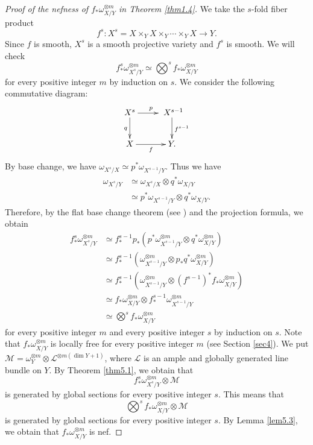 \documentclass[12pt,twoside]{amsart}
\theoremstyle{definition}
\begin{document}
\begin{proof}[Proof of the nefness of $f_*\omega^{\otimes m}_{X/Y}$ 
in Theorem \ref{thm1.4}] 
We take the $s$-fold fiber product 
$$f^s:X^s=X\times _YX\times _Y\cdots \times _Y X\to Y. 
$$ 
Since $f$ is smooth, 
$X^s$ is a smooth projective variety and $f^s$ is smooth. 
We will check 
$$
f^s_*\omega^{\otimes m}_{X^s/Y}\simeq \bigotimes ^{s} 
f_*\omega^{\otimes m}_{X/Y} 
$$ 
for every positive integer $m$ by induction on $s$. 
We consider the following commutative diagram: 
$$
\xymatrix{
X^s\ar[r]^p\ar[d]_q&\ X^{s-1}\ar[d]^{f^{s-1}}\\
X\ar[r]_f & Y. 
}
$$ 
By  base change, 
we have $\omega_{X^s/X}\simeq p^*\omega_{X^{s-1}/Y}$. 
Thus we have 
\begin{align*}
\omega_{X^s/Y}&\simeq \omega_{X^s/X}\otimes q^*\omega_{X/Y} 
\\&\simeq p^*\omega_{X^{s-1}/Y}\otimes q^*\omega_{X/Y}. 
\end{align*}
Therefore, by the flat base change theorem 
(see \cite[Chapter III, Proposition 9.3]{hartshorne}) 
and the projection formula, we obtain 
\begin{align*}
f^s_*\omega^{\otimes m}_{X^s/Y}&\simeq 
f^{s-1}_*p_*(p^*\omega^{\otimes m}_{X^{s-1}/Y}
\otimes q^*\omega^{\otimes m}_{X/Y})\\
&\simeq f^{s-1}_*(\omega^{\otimes m}_{X^{s-1}/Y}
\otimes p_*q^*\omega^{\otimes m}_{X/Y})\\
&\simeq  f^{s-1}_*(\omega^{\otimes m}_{X^{s-1}/Y}
\otimes (f^{s-1})^*f_*\omega^{\otimes m}_{X/Y})\\
&\simeq f_*\omega^{\otimes m}_{X/Y}\otimes 
f^{s-1}_*\omega^{\otimes m}_{X^{s-1}/Y}\\
&\simeq \bigotimes ^s f_*\omega^{\otimes m}_{X/Y}
\end{align*} 
for every positive integer $m$ and every positive integer $s$ by 
induction on $s$. Note that 
$f_*\omega^{\otimes m}_{X/Y}$ is locally free for every positive integer $m$ 
(see Section \ref{sec4}). 
We put $\mathcal M=\omega^{\otimes m}_Y\otimes \mathcal L^{\otimes 
m(\dim Y+1)}$, where 
$\mathcal L$ is an ample and 
globally generated line bundle on $Y$. 
By Theorem \ref{thm5.1}, 
we obtain that 
$$
f^s_*\omega^{\otimes m}_{X^s/Y} \otimes \mathcal M
$$ 
is generated by global sections for every positive integer $s$. 
This means that 
$$
\bigotimes ^{s} 
f_*\omega^{\otimes m}_{X/Y} 
\otimes \mathcal M
$$ is generated by global sections for every positive integer $s$. 
By Lemma \ref{lem5.3}, 
we obtain that $f_*\omega^{\otimes m}_{X/Y}$ is nef. 
\end{proof}
\end{document}
